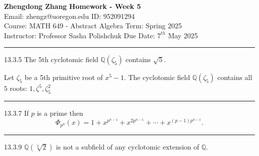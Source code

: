 \documentclass[a4paper, 12pt]{article}
\begin{document}
\noindent

\large\textbf{Zhengdong Zhang} \hfill \textbf{Homework - Week 5} \\
Email: zhengz@uoregon.edu \hfill ID: 952091294 \\
\normalsize Course: MATH 649 - Abstract Algebra \hfill Term: Spring 2025 \\
Instructor: Professor Sasha Polishchuk \hfill Due Date: $7^{th}$ May 2025 \\
\noindent\rule{7in}{2.8pt}

\begin{problem}{13.3.5}
The 5th cyclotomic field \(\mathbb{Q}(\zeta_5)\) contains \(\sqrt{5}\). 
\end{problem}
\begin{solution}
Let \(\zeta_5\) be a 5th primitive root of \(x^5-1\). The cyclotomic field \(\mathbb{Q}(\zeta_5)\) contains all \(5\) roots: \(1,\zeta^5,\zeta_5^2\) 
\end{solution}

\noindent\rule{7in}{2.8pt}
\begin{problem}{13.3.7}
If \(p\) is a prime then 
\[\Phi_{p^n}(x)=1+x^{p^{n-1}}+x^{2p^{n-1}}+\cdots+x^{(p-1)p^{n-1}}.\]
\end{problem}
\begin{solution}

\end{solution}

\noindent\rule{7in}{2.8pt}
\begin{problem}{13.3.9}
\(\mathbb{Q}(\sqrt[3]{2})\) is not a subfield of any cyclotomic extension of \(\mathbb{Q}\).
\end{problem}
\begin{solution}

\end{solution}
\end{document}

